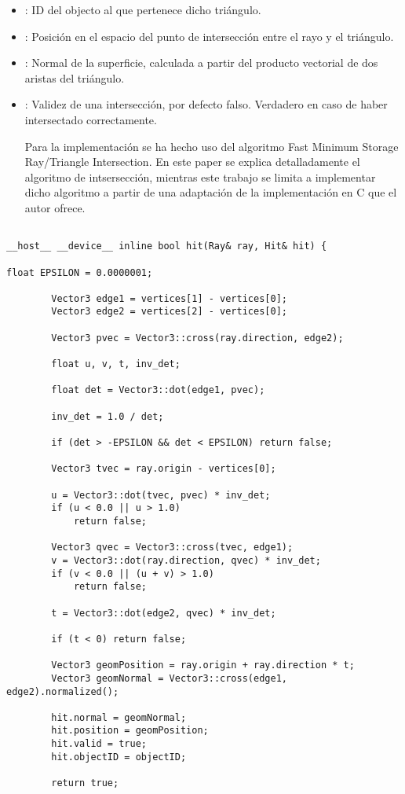 \begin{itemize}
	
	\item {}: ID del objecto al que pertenece dicho triángulo.
	
	\item {}: Posición en el espacio del punto de intersección entre el rayo y el triángulo.
	
	\item {}: Normal de la superficie, calculada a partir del producto vectorial de dos aristas del triángulo.
	
	\item {}: Validez de una intersección, por defecto falso. Verdadero en caso de haber intersectado correctamente.

Para la implementación se ha hecho uso del algoritmo Fast Minimum Storage Ray/Triangle Intersection\cite{moller1997fast}. En este paper se explica detalladamente el algoritmo de intsersección, mientras este trabajo se limita a implementar dicho algoritmo a partir de una adaptación de la implementación en C que el autor ofrece.


\end{itemize}
	
\begin{lstlisting}
	
__host__ __device__ inline bool hit(Ray& ray, Hit& hit) {

float EPSILON = 0.0000001;

        Vector3 edge1 = vertices[1] - vertices[0];
        Vector3 edge2 = vertices[2] - vertices[0];

        Vector3 pvec = Vector3::cross(ray.direction, edge2);

        float u, v, t, inv_det;

        float det = Vector3::dot(edge1, pvec);

        inv_det = 1.0 / det;

        if (det > -EPSILON && det < EPSILON) return false;

        Vector3 tvec = ray.origin - vertices[0];

        u = Vector3::dot(tvec, pvec) * inv_det;
        if (u < 0.0 || u > 1.0)
            return false;

        Vector3 qvec = Vector3::cross(tvec, edge1);
        v = Vector3::dot(ray.direction, qvec) * inv_det;
        if (v < 0.0 || (u + v) > 1.0)
            return false;

        t = Vector3::dot(edge2, qvec) * inv_det;

        if (t < 0) return false;

        Vector3 geomPosition = ray.origin + ray.direction * t;
		Vector3 geomNormal = Vector3::cross(edge1, edge2).normalized();
		
		hit.normal = geomNormal;
		hit.position = geomPosition;
		hit.valid = true;
		hit.objectID = objectID;

        return true;

\end{lstlisting}

